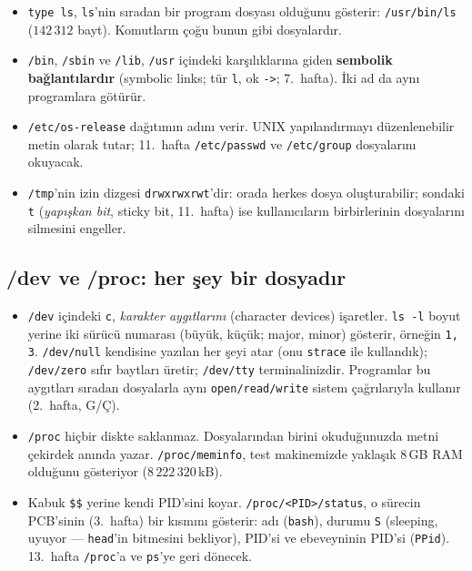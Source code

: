 \documentclass[11pt,a4paper]{article}
\newcommand{\term}[1]{\textbf{\color{mintdeep}#1}}
\newcommand{\cmd}[1]{\texttt{#1}}
\begin{document}
\begin{itemize}
  \item \cmd{type ls}, \cmd{ls}'nin sıradan bir program dosyası olduğunu gösterir: \texttt{/usr/bin/ls} ($142\,312$ bayt). Komutların çoğu bunun gibi dosyalardır.
  \item \texttt{/bin}, \texttt{/sbin} ve \texttt{/lib}, \texttt{/usr} içindeki karşılıklarına giden \term{sembolik bağlantılardır} (symbolic links; tür \texttt{l}, ok \texttt{->}; 7.\ hafta). İki ad da aynı programlara götürür.
  \item \texttt{/etc/os-release} dağıtımın adını verir. UNIX yapılandırmayı düzenlenebilir metin olarak tutar; 11.\ hafta \texttt{/etc/passwd} ve \texttt{/etc/group} dosyalarını okuyacak.
  \item \texttt{/tmp}'nin izin dizgesi \texttt{drwxrwxrwt}'dir: orada herkes dosya oluşturabilir; sondaki \texttt{t} (\emph{yapışkan bit}, sticky bit, 11.\ hafta) ise kullanıcıların birbirlerinin dosyalarını silmesini engeller.
\end{itemize}

\subsection{/dev ve /proc: her şey bir dosyadır}


\begin{itemize}
  \item \texttt{/dev} içindeki \texttt{c}, \emph{karakter aygıtlarını} (character devices) işaretler. \cmd{ls -l} boyut yerine iki sürücü numarası (büyük, küçük; major, minor) gösterir, örneğin \texttt{1, 3}. \texttt{/dev/null} kendisine yazılan her şeyi atar (onu \cmd{strace} ile kullandık); \texttt{/dev/zero} sıfır baytları üretir; \texttt{/dev/tty} terminalinizdir. Programlar bu aygıtları sıradan dosyalarla aynı \texttt{open/read/write} sistem çağrılarıyla kullanır (2.\ hafta, G/Ç).
  \item \texttt{/proc} hiçbir diskte saklanmaz. Dosyalarından birini okuduğunuzda metni çekirdek anında yazar. \texttt{/proc/meminfo}, test makinemizde yaklaşık $8$\,GB RAM olduğunu gösteriyor ($8\,222\,320$\,kB).
  \item Kabuk \texttt{\$\$} yerine kendi PID'sini koyar. \texttt{/proc/<PID>/status}, o sürecin PCB'sinin (3.\ hafta) bir kısmını gösterir: adı (\texttt{bash}), durumu \texttt{S} (sleeping, uyuyor --- \cmd{head}'in bitmesini bekliyor), PID'si ve ebeveyninin PID'si (\texttt{PPid}). 13.\ hafta \texttt{/proc}'a ve \cmd{ps}'ye geri dönecek.
\end{itemize}
\end{document}
